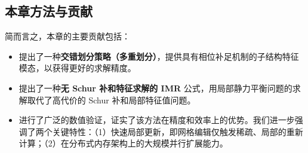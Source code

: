\subsection{本章方法与贡献}

简而言之，本章的主要贡献包括：
\begin{itemize}
\item 提出了一种\textbf{交错划分策略（多重划分）}，提供具有相位补足机制的子结构特征模态，以获得更好的求解精度。
\item 提出了一种\textbf{无 Schur 补和特征求解的 IMR} 公式，用局部静力平衡问题的求解取代了高代价的 Schur 补和局部特征值问题。
\item 进行了广泛的数值验证，证实了该方法在精度和效率上的优势。我们进一步强调了两个关键特性：（1）快速局部更新，即网格编辑仅触发稀疏、局部的重新计算；（2）在分布式内存架构上的大规模并行扩展能力。
\end{itemize}
